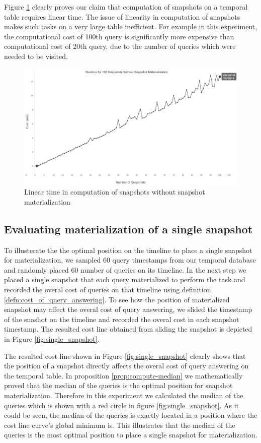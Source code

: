 			Figure \ref{fig:linear_time} clearly proves our claim that computation of snapshots on a temporal table requires linear time. The issue of linearity in computation of snapshots makes such tasks on a very large table inefficient. For example in this experiment, the computational cost of 100th query is significantly more expensive than computational cost of 20th query, due to the number of queries which were needed to be visited.

			\begin{figure}
				\centering
				\includegraphics[width=120mm]{figs/runtime.jpg}
				\caption{Linear time in computation of snapshots without snapshot materialization}
				\label{fig:linear_time}
			\end{figure} 

		\subsection{Evaluating materialization of a single snapshot} \label{sec:evaluating_single_snapshot}
			To illusterate the the optimal position on the timeline to place a single snapshot for materialization, we sampled 60 query timestamps from our temporal database and randomly placed 60 number of queries on its timeline. In the next step we placed a single snapshot that each query materialized to perform the task and recorded the overal cost of queries on that timeline using definition \ref{defn:cost_of_query_answering}. To see how the position of materialized snapshot may affect the overal cost of query answering, we slided the timestamp of the snashot on the timeline and recorded the overal cost in each snapshot timestamp. The resulted cost line obtained from sliding the snapshot is depicted in Figure \ref{fig:single_snapshot}. 

			The resulted cost line shown in Figure \ref{fig:single_snapshot} clearly shows that the position of a snapshot directly affects the overal cost of query answering on the temporal table. In proposition \ref{prop:compute-median} we mathematically proved that the median of the queries is the optimal position for snapshot materialization. Therefore in this experiment we calculated the median of the queries which is shown with a red circle in figure \ref{fig:single_snapshot}. As it could be seen, the median of the queries is exactly located in a position where the cost line curve's global minimum is. This illustrates that the median of the queries is the most optimal position to place a single snapshot for materialization.

